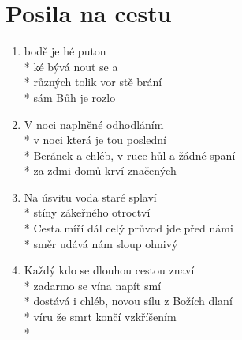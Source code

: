 \section{Posila na cestu}
\begin{enumerate}
\item {}bodě je hé puton  \\*
ké bývá nout se a   \\*
 různých  tolik vor stě brání \\*
 sám Bůh je  rozlo   
\item V noci naplněné odhodláním \\*
v noci která je tou poslední \\*
Beránek a chléb, v ruce hůl a žádné spaní \\*
za zdmi domů krví značených 
\item Na úsvitu voda staré splaví \\*
stíny zákeřného otroctví \\*
Cesta míří dál celý průvod jde před námi \\*
směr udává nám sloup ohnivý 
\item Každý kdo se dlouhou cestou znaví \\*
zadarmo se vína napít smí \\*
dostává i chléb, novou sílu z Božích dlaní \\*
víru že smrt končí vzkříšením \\*
\end{enumerate}
